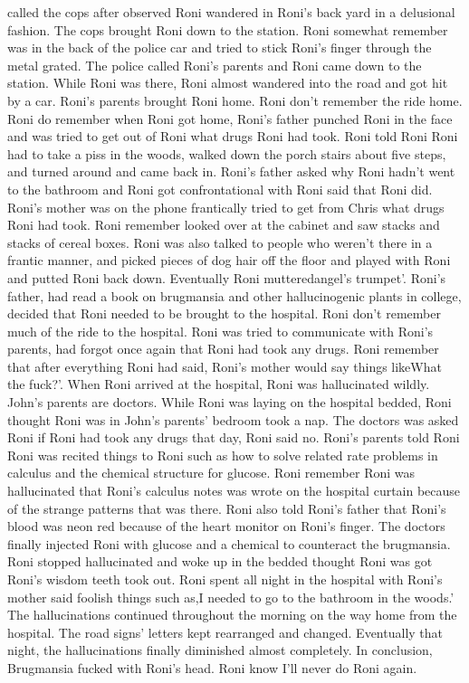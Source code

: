 \documentclass[12pt]{book}
\begin{document}
called the cops after observed Roni wandered in Roni's back yard in a delusional fashion. The cops brought Roni down to the station. Roni somewhat remember was in the back of the police car and tried to stick Roni's finger through the metal grated. The police called Roni's parents and Roni came down to the station. While Roni was there, Roni almost wandered into the road and got hit by a car. Roni's parents brought Roni home. Roni don't remember the ride home. Roni do remember when Roni got home, Roni's father punched Roni in the face and was tried to get out of Roni what drugs Roni had took. Roni told Roni Roni had to take a piss in the woods, walked down the porch stairs about five steps, and turned around and came back in. Roni's father asked why Roni hadn't went to the bathroom and Roni got confrontational with Roni said that Roni did. Roni's mother was on the phone frantically tried to get from Chris what drugs Roni had took. Roni remember looked over at the cabinet and saw stacks and stacks of cereal boxes. Roni was also talked to people who weren't there in a frantic manner, and picked pieces of dog hair off the floor and played with Roni and putted Roni back down. Eventually Roni mutteredangel's trumpet'. Roni's father, had read a book on brugmansia and other hallucinogenic plants in college, decided that Roni needed to be brought to the hospital. Roni don't remember much of the ride to the hospital. Roni was tried to communicate with Roni's parents, had forgot once again that Roni had took any drugs. Roni remember that after everything Roni had said, Roni's mother would say things likeWhat the fuck?'. When Roni arrived at the hospital, Roni was hallucinated wildly. John's parents are doctors. While Roni was laying on the hospital bedded, Roni thought Roni was in John's parents' bedroom took a nap. The doctors was asked Roni if Roni had took any drugs that day, Roni said no. Roni's parents told Roni Roni was recited things to Roni such as how to solve related rate problems in calculus and the chemical structure for glucose. Roni remember Roni was hallucinated that Roni's calculus notes was wrote on the hospital curtain because of the strange patterns that was there. Roni also told Roni's father that Roni's blood was neon red because of the heart monitor on Roni's finger. The doctors finally injected Roni with glucose and a chemical to counteract the brugmansia. Roni stopped hallucinated and woke up in the bedded thought Roni was got Roni's wisdom teeth took out. Roni spent all night in the hospital with Roni's mother said foolish things such as,I needed to go to the bathroom in the woods.' The hallucinations continued throughout the morning on the way home from the hospital. The road signs' letters kept rearranged and changed. Eventually that night, the hallucinations finally diminished almost completely. In conclusion, Brugmansia fucked with Roni's head. Roni know I'll never do Roni again.
\end{document}
